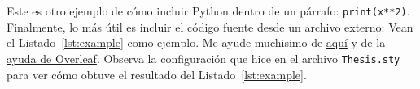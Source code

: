 Este es otro ejemplo de cómo incluir Python dentro de un párrafo: \texttt{print(x**2)}.
Finalmente, lo más útil es incluir el código fuente desde un archivo externo: Vean  el Listado~\ref{lst:example} como ejemplo.
Me ayude muchisimo de \href{https://tex.stackexchange.com/questions/252263/alignment-of-minted-line-numbers}{aquí} y de la \href{https://www.overleaf.com/learn/latex/Code_Highlighting_with_minted}{ayuda de Overleaf}.
Observa la configuración que hice en el archivo \verb|Thesis.sty| para ver cómo obtuve el resultado del Listado~\ref{lst:example}.


